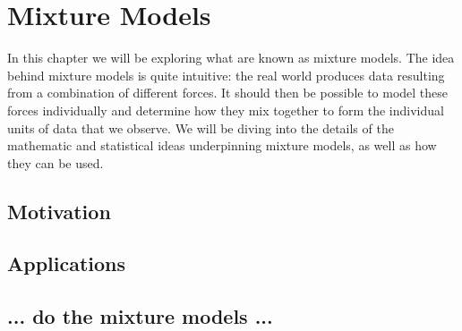 \chapter{Mixture Models}
In this chapter we will be exploring what are known as mixture models. The idea behind mixture models is quite intuitive: the real world produces data resulting from a combination of different forces. It should then be possible to model these forces individually and determine how they mix together to form the individual units of data that we observe. We will be diving into the details of the mathematic and statistical ideas underpinning mixture models, as well as how they can be used.

\section{Motivation}
\section{Applications}
\section{... do the mixture models ...}